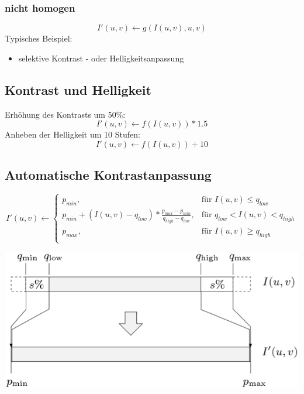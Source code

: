 \documentclass[10pt]{article}
\begin{document}
\subsubsection{nicht homogen}
\begin{equation*}
	I'(u,v) \leftarrow g(I(u,v), u, v)
\end{equation*}
Typisches Beispiel:
\begin{itemize}
	\item selektive Kontrast - oder Helligkeitsanpassung
\end{itemize}

\subsection{Kontrast und Helligkeit}
Erhöhung des Kontrasts um 50\%:
\begin{equation*}
	I'(u,v) \leftarrow f(I(u,v)) * 1.5
\end{equation*}
Anheben der Helligkeit um 10 Stufen:
\begin{equation*}
	I'(u,v) \leftarrow f(I(u,v)) + 10
\end{equation*}

\subsection{Automatische Kontrastanpassung}
\begin{equation*}
	I'(u,v) \leftarrow \begin{cases}
  p_{min},  & \text{für } I(u,v) \leq q_{low}\\
  p_{min} + (I(u,v) - q_{low}) * \frac{p_{max}-p_{min}}{q_{high}-q_{low}},  & \text{für } q_{low} < I(u,v) < q_{high}\\
  p_{max}, & \text{für } I(u,v) \geq q_{high}\\
\end{cases}
\end{equation*}
\begin{center}
	\includegraphics[scale=0.3]{kontrastanpassung.png}
\end{center}
\end{document}
